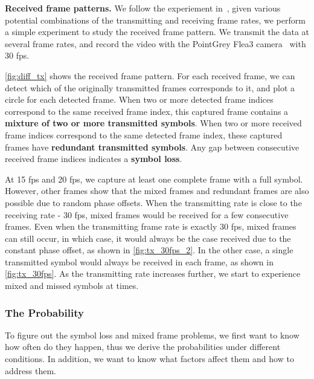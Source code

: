
\textbf{Received frame patterns.} We follow the experiement in~\cite{hu2013lightsync}, given various potential combinations of the transmitting and receiving frame rates, we perform a simple experiment to study the received frame pattern. We transmit the data at several frame rates, and record the video with the PointGrey Flea3 camera~\cite{pointgrey_flea} with 30 fps. 

\autoref{fig:diff_tx} shows the received frame pattern. For each received frame, we can detect which of the originally transmitted frames corresponds to it, and plot a circle for each detected frame. When two or more detected frame indices correspond to the same received frame index, this captured frame contains a \textbf{mixture of two or more transmitted symbols}. When two or more received frame indices correspond to the same detected frame index, these captured frames have \textbf{redundant transmitted symbols}. Any gap between consecutive received frame indices indicates a \textbf{symbol loss}. 

At 15 fps and 20 fps, we capture at least one complete frame with a full symbol. However, other frames show that the mixed frames and redundant frames are also possible due to random phase offsets. When the transmitting rate is close to the receiving rate - 30 fps, mixed frames would be received for a few consecutive frames. Even when the transmitting frame rate is exactly 30 fps, mixed frames can still occur, in which case, it would always be the case received due to the constant phase offset, as shown in \autoref{fig:tx_30fps_2}. In the other case, a single transmitted symbol would always be received in each frame, as shown in \autoref{fig:tx_30fps}.
As the transmitting rate increases further, we start to experience mixed and missed symbols at times.


\subsubsection{The Probability}
\label{sec:unsync}
To figure out the symbol loss and mixed frame problems, we first want to know how often do they happen, thus we derive the probabilities under different conditions. In addition, we want to know what factors affect them and how to address them. 

